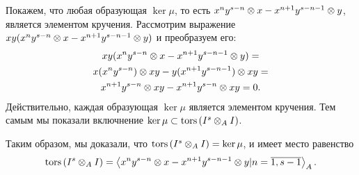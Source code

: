 \begin{Proof}
        Покажем, что любая образующая $\ker \mu$, то есть $x^ny^{s - n} \otimes x - x^{n + 1}y^{s - n - 1} \otimes y$,
        является элементом кручения. Рассмотрим выражение 
        $xy(x^ny^{s - n} \otimes x - x^{n + 1}y^{s - n - 1} \otimes y)$ и преобразуем его:
        \begin{multline*}
            xy(x^ny^{s - n} \otimes x - x^{n + 1}y^{s - n - 1} \otimes y) = \\
            x(x^ny^{s - n}) \otimes xy - y(x^{n + 1}y^{s - n - 1}) \otimes xy = \\
            x^{n + 1}y^{s - n} \otimes xy - x^{n + 1}y^{s - n} \otimes xy = 0.
        \end{multline*}
        Действительно, каждая образующая $\ker \mu$ является элементом кручения. Тем самым мы показали
        включнение $\ker \mu \subset \textup{tors}\left(I^s \otimes_A I\right)$.

        Таким образом,  мы доказали, что $\textup{tors}\left(I^s \otimes_A I\right) = \ker \mu $, и имеет место равенство
        \begin{equation*}
            \textup{tors}\left(I^s \otimes_A I\right) = \left< x^ny^{s - n} \otimes x - x^{n + 1}y^{s - n - 1} \otimes y |
            n = \overline{1, s-1}\right>_A.
        \end{equation*}
    \end{Proof}

